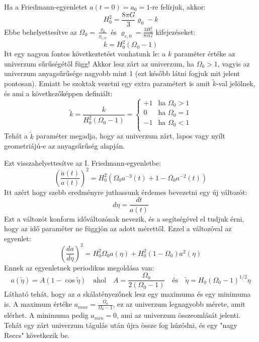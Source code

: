 \documentclass[../main.tex]{subfiles}
\begin{document}
Ha a Friedmann-egyenletet $a(t = 0) = a_0 = 1$-re felírjuk, akkor:
\begin{equation}
    H^2_0 = \frac{8 \pi G}{3} \varrho_0 - k
\end{equation}
Ebbe behelyettesítve az $\Omega_0 = \frac{\varrho_0}{\varrho_{c, 0}}$ és $\varrho_{c, 0} = \frac{3 H^2_0}{8 \pi G}$ kifejezéseket:
\begin{equation}
    k = H^2_0 (\Omega_0 - 1)
\end{equation}
Itt egy nagyon fontos következtetést vonhatunk le: a $k$ paraméter értéke az univerzum sűrűségétől függ! Akkor lesz zárt az univerzum, ha $\Omega_0 > 1$, vagyis az univerzum anyagsűrűsége nagyobb mint 1 (ezt később látni fogjuk mit jelent pontosan).
Emiatt be szoktak vezetni egy extra paramétert is amit $\tilde{k}$-val jelölnek, és ami a következőképpen definiált:
\begin{equation}
    \tilde{k} = \frac{k}{H_0^2(\Omega_0 - 1)} = \begin{cases}
        +1 & \text{ha } \Omega_0 > 1 \\
        0 & \text{ha } \Omega_0 = 1 \\
        -1 & \text{ha } \Omega_0 < 1 \\
    \end{cases}
\end{equation}
Tehát a $\tilde{k}$ paraméter megadja, hogy az univerzum zárt, lapos vagy nyílt geometriájú-e az anyagsűrűség alapján.

Ezt visszahelyettesítve az I. Friedmann-egyenletbe:
\begin{equation}
    \left(\frac{\dot{a}(t)}{a(t)}\right)^2 = H^2_0 \left(\Omega_0 a^{-3}(t) + 1 - \Omega_0 a^{-2}(t)\right)
\end{equation}
Itt azért hogy szebb eredményre juthassunk érdemes bevezetni egy új változót:
\begin{equation}
    d\eta = \frac{d t}{a(t)}
\end{equation}
Ezt a változót konform időváltozónak nevezik, és a segítségével el tudjuk érni, hogy az idő paraméter ne függjön az adott mérettől. Ezzel a változóval az egyenlet:
\begin{equation}
    \left(\frac{d a}{d \eta}\right)^2 = H^2_0\Omega_0 a(\eta) + H^2_0 (1 - \Omega_0) a^2(\eta)
\end{equation}
Ennek az egyenletnek periodikus megoldása van:
\begin{equation}
    \boxed{a(\tilde{\eta}) = A (1 - \cos \tilde{\eta})} \quad \text{ahol} \quad A = \frac{\Omega_0}{2(\Omega_0 - 1)} \quad \text{és} \quad \tilde{\eta} = H_0 (\Omega_0- 1)^{1/2} \eta
\end{equation}
Látható tehát, hogy az $a$ skálatényezőnek lesz egy maximuma és egy minimuma is. A maximum értéke $a_{max} = \frac{\Omega_0}{\Omega_0 - 1}$, ez az univerzum legnagyobb mérete, amit elérhet.
A minimuma pedig $a_{min} = 0$, ami az univerzum összeomlását jelenti. Tehát egy zárt univerzum tágulás után újra össze fog húzódni, és egy "nagy Reccs" következik be.
\end{document}
